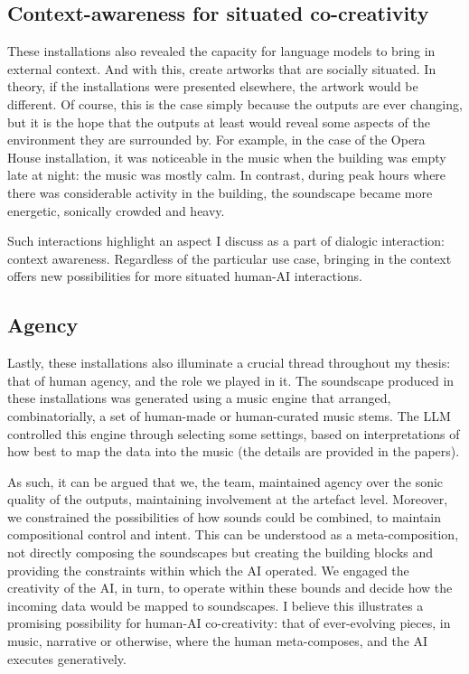 \subsection{Context-awareness for situated co-creativity}


These installations also revealed the capacity for language models to bring in external context. And with this, create artworks that are socially situated. In theory, if the installations were presented elsewhere, the artwork would be different. Of course, this is the case simply because the outputs are ever changing, but it is the hope that the outputs at least would reveal some aspects of the environment they are surrounded by. For example, in the case of the Opera House installation, it was noticeable in the music when the building was empty late at night: the music was mostly calm. In contrast, during peak hours where there was considerable activity in the building, the soundscape became more energetic, sonically crowded and heavy.

Such interactions highlight an aspect I discuss as a part of dialogic interaction: context awareness. Regardless of the particular use case, bringing in the context offers new possibilities for more situated human-AI interactions.

\subsection{Agency}

Lastly, these installations also illuminate a crucial thread throughout my thesis: that of human agency, and the role we played in it. The soundscape produced in these installations was generated using a music engine that arranged, combinatorially, a set of human-made or human-curated music stems. The LLM controlled this engine through selecting some settings, based on interpretations of how best to map the data into the music (the details are provided in the papers).

As such, it can be argued that we, the team, maintained agency over the sonic quality of the outputs, maintaining involvement at the artefact level. Moreover, we constrained the possibilities of how sounds could be combined, to maintain compositional control and intent. This can be understood as a meta-composition, not directly composing the soundscapes but creating the building blocks and providing the constraints within which the AI operated. We engaged the creativity of the AI, in turn, to operate within these bounds and decide how the incoming data would be mapped to soundscapes. I believe this illustrates a promising possibility for human-AI co-creativity: that of ever-evolving pieces, in music, narrative or otherwise, where the human meta-composes, and the AI executes generatively.


